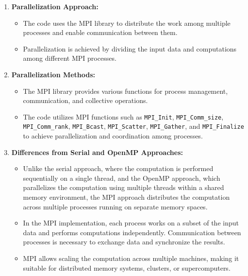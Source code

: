 \begin{enumerate}
  \item \textbf{Parallelization Approach:}
  \begin{itemize}
    \item The code uses the MPI library to distribute the work among multiple processes and enable communication between them.
    \item Parallelization is achieved by dividing the input data and computations among different MPI processes.
  \end{itemize}

  \item \textbf{Parallelization Methods:}
  \begin{itemize}
    \item The MPI library provides various functions for process management, communication, and collective operations.
    \item The code utilizes MPI functions such as \lstinline{MPI_Init}, \lstinline{MPI_Comm_size}, \lstinline{MPI_Comm_rank}, \lstinline{MPI_Bcast}, \lstinline{MPI_Scatter}, \lstinline{MPI_Gather}, and \lstinline{MPI_Finalize} to achieve parallelization and coordination among processes.
  \end{itemize}

  \item \textbf{Differences from Serial and OpenMP Approaches:}
  \begin{itemize}
    \item Unlike the serial approach, where the computation is performed sequentially on a single thread, and the OpenMP approach, which parallelizes the computation using multiple threads within a shared memory environment, the MPI approach distributes the computation across multiple processes running on separate memory spaces.
    \item In the MPI implementation, each process works on a subset of the input data and performs computations independently. Communication between processes is necessary to exchange data and synchronize the results.
    \item MPI allows scaling the computation across multiple machines, making it suitable for distributed memory systems, clusters, or supercomputers.
  \end{itemize}


\end{enumerate}
